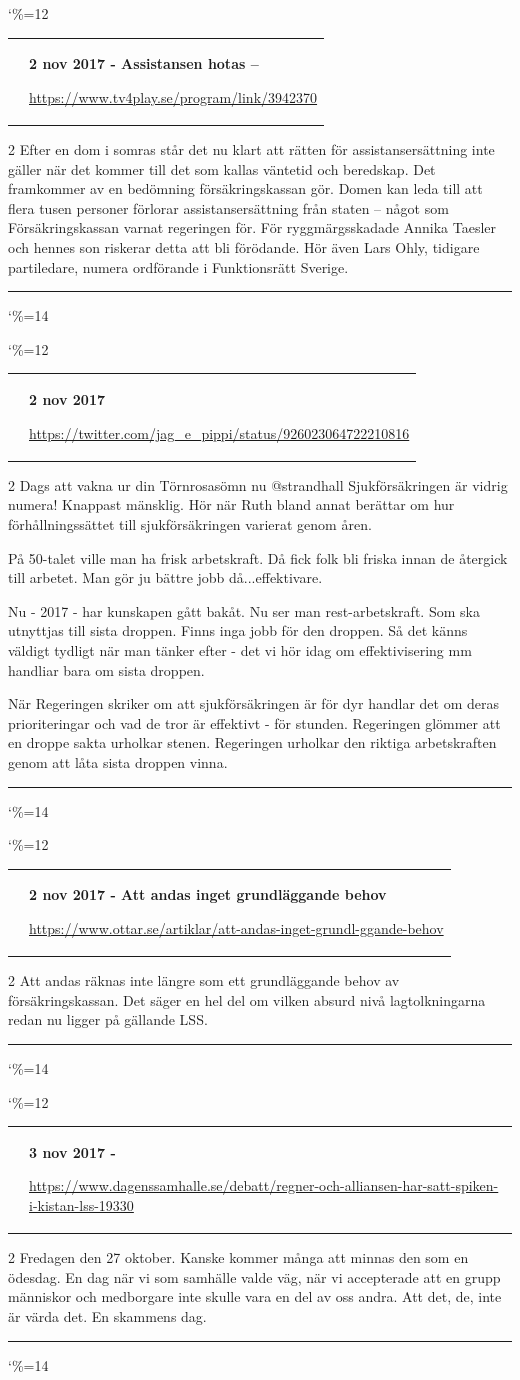 \documentclass[a4paper]{article}
\makeatletter
\newcommand{\entry}{
\catcode`\%=12
\@entry}
\newcommand{\@entry}[3]{
\bigskip
\begin{tabular*}{\textwidth}{l m{\textwidth-4cm}}
\qrcode{#3} & \textbf{#1}

\medskip

\url{#3}

\end{tabular*}

\medskip


\begin{multicols}{2}
#2
\end{multicols}

\medskip
\hrule

\catcode`\%=14
}
\makeatother
\begin{document}
{{\entry{2 nov 2017 - Assistansen hotas – \say{det här är ett krig för vårt människovärde}}{Efter en dom i somras står det nu klart att rätten för assistansersättning inte gäller när det kommer till det som kallas väntetid och beredskap. Det framkommer av en bedömning försäkringskassan gör. Domen kan leda till att flera tusen personer förlorar assistansersättning från staten – något som Försäkringskassan varnat regeringen för. För ryggmärgsskadade Annika Taesler och hennes son riskerar detta att bli förödande. Hör även Lars Ohly, tidigare partiledare, numera ordförande i Funktionsrätt Sverige.}{https://www.tv4play.se/program/link/3942370}


\entry{2 nov 2017}{Dags att vakna ur din Törnrosasömn nu @strandhall
Sjukförsäkringen är vidrig numera! Knappast mänsklig. Hör när Ruth bland annat berättar om hur förhållningssättet till sjukförsäkringen varierat genom åren.

På 50-talet ville man ha frisk arbetskraft.
Då fick folk bli friska innan de återgick till arbetet.
Man gör ju bättre jobb då...effektivare.

Nu - 2017 - har kunskapen gått bakåt.
Nu ser man rest-arbetskraft. Som ska utnyttjas till sista droppen.
Finns inga jobb för den droppen. Så det känns väldigt tydligt när man tänker efter - det vi hör idag om effektivisering mm handliar bara om sista droppen.

När Regeringen skriker om att sjukförsäkringen är för dyr handlar det om deras prioriteringar och vad de tror är effektivt - för stunden.
Regeringen glömmer att en droppe sakta urholkar stenen.
Regeringen urholkar den riktiga arbetskraften genom att låta sista droppen vinna.}{https://twitter.com/jag_e_pippi/status/926023064722210816}

\entry{2 nov 2017 - Att andas inget grundläggande behov}{Att andas räknas inte längre som ett grundläggande behov av försäkringskassan. Det säger en hel del om vilken absurd nivå lagtolkningarna redan nu ligger på gällande LSS.}{https://www.ottar.se/artiklar/att-andas-inget-grundl-ggande-behov}


\entry{3 nov 2017 - \say{Regnér - och Alliansen - har satt spiken i kistan för LSS}}{Fredagen den 27 oktober. Kanske kommer många att minnas den som en ödesdag. En dag när vi som samhälle valde väg, när vi accepterade att en grupp människor och medborgare inte skulle vara en del av oss andra. Att det, de, inte är värda det. En skammens dag.}{https://www.dagenssamhalle.se/debatt/regner-och-alliansen-har-satt-spiken-i-kistan-lss-19330}

}}
\end{document}

